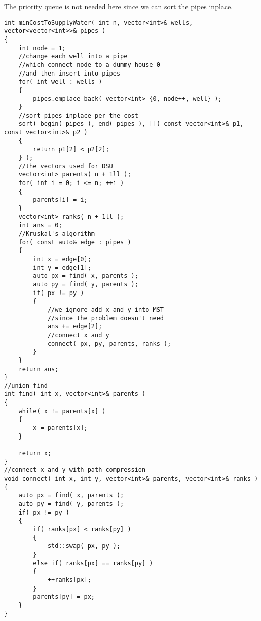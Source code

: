 The priority queue is not needed here since we can sort the pipes inplace.
\begin{lstlisting}[style=customc, caption={MST By Kruskal}]
int minCostToSupplyWater( int n, vector<int>& wells, vector<vector<int>>& pipes )
{
    int node = 1;
    //change each well into a pipe
    //which connect node to a dummy house 0
    //and then insert into pipes
    for( int well : wells )
    {
        pipes.emplace_back( vector<int> {0, node++, well} );
    }
    //sort pipes inplace per the cost
    sort( begin( pipes ), end( pipes ), []( const vector<int>& p1, const vector<int>& p2 )
    {
        return p1[2] < p2[2];
    } );
    //the vectors used for DSU
    vector<int> parents( n + 1ll );
    for( int i = 0; i <= n; ++i )
    {
        parents[i] = i;
    }
    vector<int> ranks( n + 1ll );
    int ans = 0;
    //Kruskal's algorithm
    for( const auto& edge : pipes )
    {
        int x = edge[0];
        int y = edge[1];
        auto px = find( x, parents );
        auto py = find( y, parents );
        if( px != py )
        {
            //we ignore add x and y into MST
            //since the problem doesn't need
            ans += edge[2];
            //connect x and y
            connect( px, py, parents, ranks );
        }
    }
    return ans;
}
//union find
int find( int x, vector<int>& parents )
{
    while( x != parents[x] )
    {
        x = parents[x];
    }

    return x;
}
//connect x and y with path compression
void connect( int x, int y, vector<int>& parents, vector<int>& ranks )
{
    auto px = find( x, parents );
    auto py = find( y, parents );
    if( px != py )
    {
        if( ranks[px] < ranks[py] )
        {
            std::swap( px, py );
        }
        else if( ranks[px] == ranks[py] )
        {
            ++ranks[px];
        }
        parents[py] = px;
    }
}
\end{lstlisting}